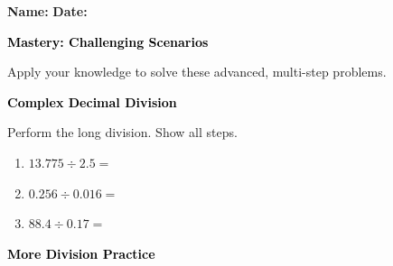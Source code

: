 \documentclass[12pt, letterpaper, fleql]{article}
\newcommand{\blank}{\underline{\hspace{2.2cm}}}
\begin{document}
\textbf{Name:} \underline{\hspace{5cm}}
\hfill
\textbf{Date:} \underline{\hspace{3cm}}\\

\begin{tcolorbox}[colback=black!10]
    \large\textcolor{black}{\textbf{Mastery: Challenging Scenarios}}
\end{tcolorbox}

\vspace{3mm}
\noindent
Apply your knowledge to solve these advanced, multi-step problems.

\vspace{4mm}

\begin{tcolorbox}[colback=black!10]
\large\textcolor{black}{\textbf{Complex Decimal Division}}
\end{tcolorbox}

\noindent
Perform the long division. Show all steps.

\vspace{3mm}
\begin{enumerate}[itemsep=2.2cm, leftmargin=0.6cm]
\item $13.775 \div 2.5 = $ \blank

\vspace{2cm}

\item $0.256 \div 0.016 = $ \blank

\vspace{2cm}

\item $88.4 \div 0.17 = $ \blank

\vspace{2cm}

\end{enumerate}

\newpage

\begin{tcolorbox}[colback=black!10]
\large\textcolor{black}{\textbf{More Division Practice}}
\end{tcolorbox}
\end{document}
